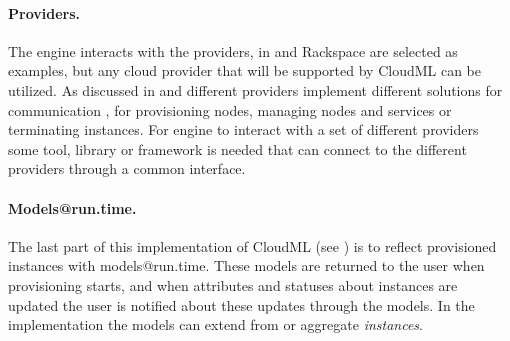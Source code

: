 \paragraph{Providers.}

The engine interacts with the providers, in  
 and Rackspace are selected as examples, but any
cloud provider that will be supported by CloudML can be utilized.
As discussed in  and 
different providers implement different solutions for communication
\eg, for provisioning nodes, managing nodes and services or terminating instances.
For engine to interact with a set of different providers some tool, library
or framework is needed that can connect to the different providers through
a common interface.

\paragraph{Models@run.time.}

The last part of this implementation of CloudML (see ) is to
reflect provisioned instances with models@run.time.
These models are returned to the user when provisioning starts, 
and when attributes and statuses about instances are updated the user is 
notified about these updates through the models.
In the implementation the models can extend from or aggregate \emph{instances}.
